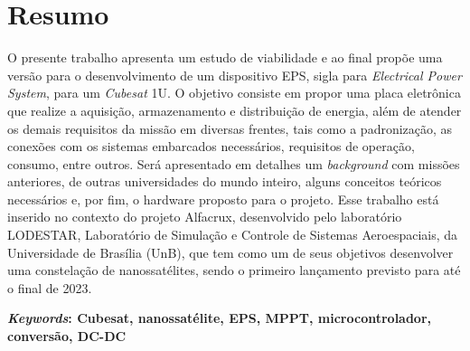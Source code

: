 \chapter*{Resumo}
O presente trabalho apresenta um estudo de viabilidade e ao final propõe uma versão para o desenvolvimento de um dispositivo EPS, sigla para \textit{Electrical Power System}, para um \textit{Cubesat} 1U. O objetivo consiste em propor uma placa eletrônica que realize a aquisição, armazenamento e distribuição de energia, além de atender os demais requisitos da missão em diversas frentes, tais como a padronização, as conexões com os sistemas embarcados necessários, requisitos de operação, consumo, entre outros. Será apresentado em detalhes um \textit{background} com missões anteriores, de outras universidades do mundo inteiro, alguns conceitos teóricos necessários e, por fim, o hardware proposto para o projeto. Esse trabalho está inserido no contexto do projeto Alfacrux, desenvolvido pelo laboratório LODESTAR, Laboratório de Simulação e Controle de Sistemas Aeroespaciais, da Universidade de Brasília (UnB), que tem como um de seus objetivos desenvolver uma constelação de nanossatélites, sendo o primeiro lançamento previsto para até o final de 2023. 

\textbf{\textit{Keywords}: Cubesat, nanossatélite, EPS, MPPT, microcontrolador, conversão, DC-DC}

